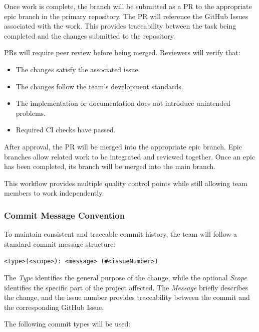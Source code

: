 \documentclass{article}
\begin{document}
Once work is complete, the branch will be submitted as a PR to the appropriate
epic branch in the primary repository. The PR will reference the GitHub Issues
associated with the work. This provides traceability between the task being
completed and the changes submitted to the repository.

PRs will require peer review before being merged. Reviewers will verify that:

\begin{itemize}
    \item The changes satisfy the associated issue.
    \item The changes follow the team's development standards.
    \item The implementation or documentation does not introduce unintended
    problems.
    \item Required CI checks have passed.
\end{itemize}

After approval, the PR will be merged into the appropriate epic branch.
Epic branches allow related work to be integrated and reviewed together.
Once an epic has been completed, its branch will be merged into the main
branch.

This workflow provides multiple quality control points while still allowing
team members to work independently.

\subsubsection{Commit Message Convention}

To maintain consistent and traceable commit history, the team will follow a
standard commit message structure:

\begin{center}
    \texttt{<type>(<scope>): <message> (\#<issueNumber>)}
\end{center}

The \textit{Type} identifies the general purpose of the change, while the
optional \textit{Scope} identifies the specific part of the project affected.
The \textit{Message} briefly describes the change, and the issue number
provides traceability between the commit and the corresponding GitHub Issue.

The following commit types will be used:
\end{document}
